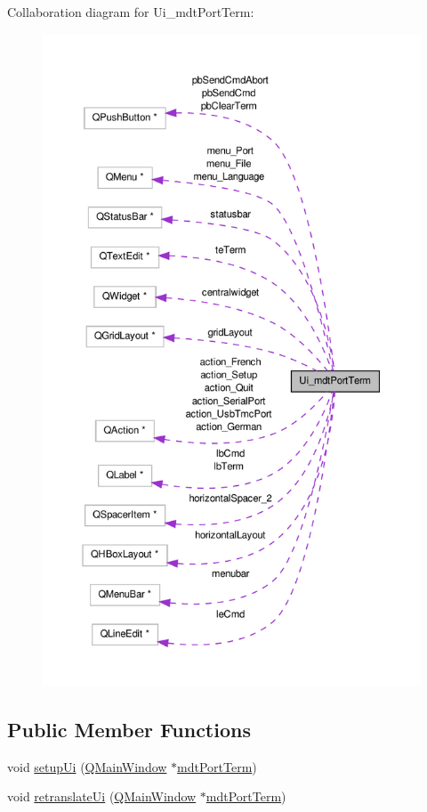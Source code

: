 Collaboration diagram for Ui\-\_\-mdt\-Port\-Term\-:
\nopagebreak
\begin{figure}[H]
\begin{center}
\leavevmode
\includegraphics[height=550pt]{class_ui__mdt_port_term__coll__graph}
\end{center}
\end{figure}
\subsection*{Public Member Functions}
\begin{DoxyCompactItemize}
\item 
void \hyperlink{class_ui__mdt_port_term_ae97b4a5882faae258e43fc924af070bc}{setup\-Ui} (\hyperlink{class_q_main_window}{Q\-Main\-Window} $\ast$\hyperlink{classmdt_port_term}{mdt\-Port\-Term})
\item 
void \hyperlink{class_ui__mdt_port_term_a3dd5088c741ecb0fb01d2952e6f9c8a7}{retranslate\-Ui} (\hyperlink{class_q_main_window}{Q\-Main\-Window} $\ast$\hyperlink{classmdt_port_term}{mdt\-Port\-Term})
\end{DoxyCompactItemize}
